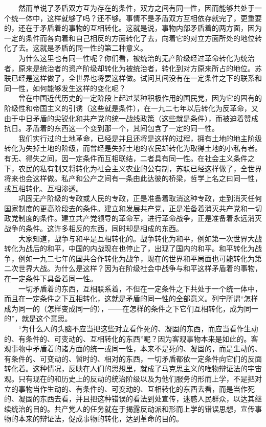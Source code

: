 \documentclass[cn,11pt,chinese]{elegantbook}
\begin{document}
　　然而单说了矛盾双方互为存在的条件，双方之间有同一性，因而能够共处于一个统一体中，这样就够了吗？还不够。事情不是矛盾双方互相依存就完了，更重要的，还在于矛盾着的事物的互相转化。这就是说，事物内部矛盾着的两方面，因为一定的条件而各向着和自己相反的方面转化了去，向着它的对立方面所处的地位转化了去。这就是矛盾的同一性的第二种意义。\\
　　为什么这里也有同一性呢？你们看，被统治的无产阶级经过革命转化为统治者，原来是统治者的资产阶级却转化为被统治者，转化到对方原来所占的地位。苏联已经是这样做了，全世界也将要这样做。试问其间没有在一定条件之下的联系和同一性，如何能够发生这样的变化呢？\\
　　曾在中国近代历史的一定阶段上起过某种积极作用的国民党，因为它的固有的阶级性和帝国主义的引诱（这些就是条件），在一九二七年以后转化为反革命，又由于中日矛盾的尖锐化和共产党的统一战线政策（这些就是条件），而被迫着赞成抗日。矛盾着的东西这一个变到那一个，其间包含了一定的同一性。\\
　　我们实行过的土地革命，已经是并且还将是这样的过程，拥有土地的地主阶级转化为失掉土地的阶级，而曾经是失掉土地的农民却转化为取得土地的小私有者。有无、得失之间，因一定条件而互相联结，二者具有同一性。在社会主义条件之下，农民的私有制又将转化为社会主义农业的公有制，苏联已经这样做了，全世界将来也会这样做。私产和公产之间有一条由此达彼的桥梁，哲学上名之曰同一性，或互相转化、互相渗透。\\
　　巩固无产阶级的专政或人民的专政，正是准备着取消这种专政，走到消灭任何国家制度的更高阶段去的条件。建立和发展共产党，正是准备着消灭共产党和一切政党制度的条件。建立共产党领导的革命军，进行革命战争，正是准备着永远消灭战争的条件。这许多相反的东西，同时却是相成的东西。\\
　　大家知道，战争与和平是互相转化的。战争转化为和平，例如第一次世界大战转化为战后的和平，中国的内战现在也停止了，出现了国内的和平。和平转化为战争，例如一九二七年的国共合作转化为战争，现在的世界和平局面也可能转化为第二次世界大战。为什么是这样？因为在阶级社会中战争与和平这样矛盾着的事物，在一定条件下具备着同一性。\\
　　一切矛盾着的东西，互相联系着，不但在一定条件之下共处于一个统一体中，而且在一定条件之下互相转化，这就是矛盾的同一性的全部意义。列宁所谓“怎样成为同一的（怎样变成同一的），——在怎样的条件之下它们互相转化，成为同一的”，就是这个意思。\\
　　“为什么人的头脑不应当把这些对立看作死的、凝固的东西，而应当看作生动的、有条件的、可变动的、互相转化的东西”呢？因为客观事物本来是如此的。客观事物中矛盾着的诸方面的统一或同一性，本来不是死的、凝固的，而是生动的、有条件的、可变动的、暂时的、相对的东西，一切矛盾都依一定条件向它们的反面转化着。这种情况，反映在人们的思想里，就成了马克思主义的唯物辩证法的宇宙观。只有现在的和历史上的反动的统治阶级以及为他们服务的形而上学，不是把对立的事物当作生动的、有条件的、可变动的、互相转化的东西去看，而是当作死的、凝固的东西去看，并且把这种错误的看法到处宣传，迷惑人民群众，以达其继续统治的目的。共产党人的任务就在于揭露反动派和形而上学的错误思想，宣传事物的本来的辩证法，促成事物的转化，达到革命的目的。\\
\end{document}
